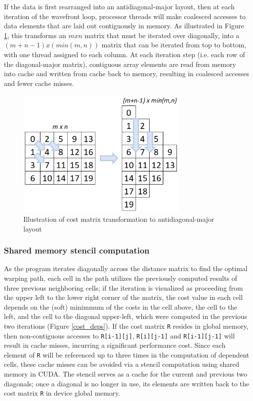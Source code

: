 \documentclass[12pt, letterpaper]{article}
\begin{document}
If the data is first rearranged into an antidiagonal-major layout, then at each
iteration of the wavefront loop, processor threads will make coalesced accesses
to data elements that are laid out contiguously in memory. As illustrated in
Figure \ref{diagonal_layout}, this transforms an $m x n$ matrix that must be
iterated over diagonally, into a $(m+n-1) x (min(m,n))$ matrix that can be
iterated from top to bottom, with one thread assigned to each column. At each
iteration step (i.e. each row of the diagonal-major matrix), contiguous array
elements are read from memory into cache and written from cache back to memory,
resulting in coalesced accesses and fewer cache misses.

\begin{figure}[htbp]
  \includegraphics[height=2.5in]{img/diagonal_layout.png}
  \centering
  \caption{Illustration of cost matrix transformation to antidiagonal-major layout}
  \label{diagonal_layout}
  \end{figure}

\subsubsection{Shared memory stencil computation}

As the program iterates diagonally across the distance matrix to find the
optimal warping path, each cell in the path utilizes the previously computed
results of three previous neighboring cells; if the iteration is visualized as
proceeding from the upper left to the lower right corner of the matrix, the cost
value in each cell depends on the (soft) minimmum of the costs in the cell
above, the cell to the left, and the cell to the diagonal upper-left, which were
computed in the previous two iterations (Figure \ref{cost_deps}). If the cost
matrix \verb|R| resides in global memory, then non-contiguous accesses to
\verb|R[i-1][j]|, \verb|R[i][j-1]| and \verb|R[i-1][j-1]| will result in cache
misses, incurring a significant performance cost. Since each element of \verb|R|
will be referenced up to three times in the computation of dependent cells,
these cache misses can be avoided via a stencil computation using shared memory
in CUDA. The stencil serves as a cache for the current and previous two
diagonals; once a diagonal is no longer in use, its elements are written back to
the cost matrix \verb|R| in device global memory.
\end{document}
